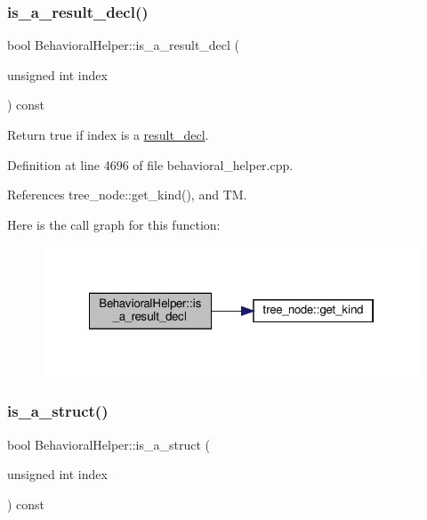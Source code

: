 \subsubsection{\texorpdfstring{is\+\_\+a\+\_\+result\+\_\+decl()}{is\_a\_result\_decl()}}
{\footnotesize\ttfamily bool Behavioral\+Helper\+::is\+\_\+a\+\_\+result\+\_\+decl (\begin{DoxyParamCaption}\item[{unsigned int}]{index }\end{DoxyParamCaption}) const\hspace{0.3cm}{\ttfamily [virtual]}}



Return true if index is a \hyperlink{structresult__decl}{result\+\_\+decl}. 



Definition at line 4696 of file behavioral\+\_\+helper.\+cpp.



References tree\+\_\+node\+::get\+\_\+kind(), and TM.

Here is the call graph for this function\+:
\nopagebreak
\begin{figure}[H]
\begin{center}
\leavevmode
\includegraphics[width=322pt]{dd/db2/classBehavioralHelper_a200f529a344b5d04ed741e06e542862f_cgraph}
\end{center}
\end{figure}
\mbox{\label{classBehavioralHelper_a4201bb60f819cbef8a2533a5da360991}} 
\subsubsection{\texorpdfstring{is\+\_\+a\+\_\+struct()}{is\_a\_struct()}}
{\footnotesize\ttfamily bool Behavioral\+Helper\+::is\+\_\+a\+\_\+struct (\begin{DoxyParamCaption}\item[{unsigned int}]{index }\end{DoxyParamCaption}) const\hspace{0.3cm}{\ttfamily [virtual]}}




